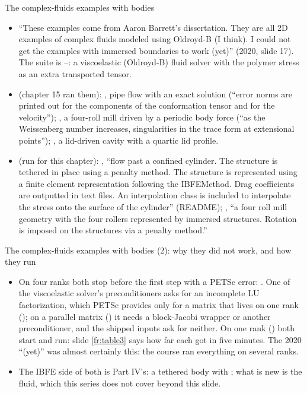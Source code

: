 \documentclass[aspectratio=169,11pt]{beamer}
\begin{document}
\begin{frame}{The complex-fluids examples with bodies}
\label{fr:cf}
\footnotesize
\begin{itemize}
  \item ``These examples come from Aaron Barrett's dissertation. They are all 2D examples of complex fluids modeled using Oldroyd-B (I think). I could not get the examples with immersed boundaries to work (yet)'' (2020, slide 17). The suite is --: a viscoelastic (Oldroyd-B) fluid solver with the polymer stress as an extra transported tensor.
  \item {} (chapter 15 ran them): , pipe flow with an exact solution (``error norms are printed out for the components of the conformation tensor and for the velocity''); , a four-roll mill driven by a periodic body force (``as the Weissenberg number increases, singularities in the trace form at extensional points''); , a lid-driven cavity with a quartic lid profile.
  \item {} (run for this chapter): , ``flow past a confined cylinder. The structure is tethered in place using a penalty method. The structure is represented using a finite element representation following the IBFEMethod. Drag coefficients are outputted in text files. An interpolation class is included to interpolate the stress onto the surface of the cylinder'' (README); , ``a four roll mill geometry with the four rollers represented by immersed structures. Rotation is imposed on the structures via a penalty method.''
\end{itemize}
\end{frame}

\begin{frame}{The complex-fluids examples with bodies (2): why they did not work, and how they run}
\label{fr:cf2}
\footnotesize
\begin{itemize}
  \item {} On four ranks both stop before the first step with a PETSc error: . One of the viscoelastic solver's preconditioners asks for an incomplete LU factorization, which PETSc provides only for a matrix that lives on one rank (); on a parallel matrix () it needs a block-Jacobi wrapper or another preconditioner, and the shipped inputs ask for neither. On one rank () both start and run: slide \ref{fr:table3} says how far each got in five minutes. The 2020 ``(yet)'' was almost certainly this: the course ran everything on several ranks.
  \item The IBFE side of both is Part IV's: a tethered body with ; what is new is the fluid, which this series does not cover beyond this slide.
\end{itemize}
\end{frame}
\end{document}
